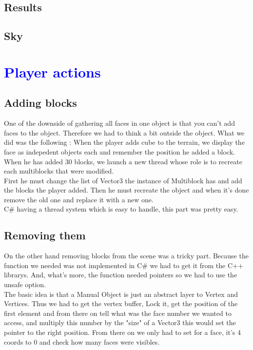 \documentclass[article]{report}             %
\begin{document}
			\section{Results}
			
			\section{Sky}

		\chapter{\textcolor{blue}{Player actions}}
			\section{Adding blocks}
				One of the downside of gathering all faces in one object is that you can't add faces to the object. Therefore we had to think a bit outside the object. What we did was the following : When the player adds cube to the terrain, we display the face as indepedent objects each and remember the position he added a block. When he has added 30 blocks, we launch a new thread whose role is to recreate each multiblocks that were modified.\\

		First he must change the list of Vector3 the instance of Multiblock has and add the blocks the player added. Then he must recreate the object and when it's done remove the old one and replace it with a new one.\\

		C\# having a thread system which is easy to handle, this part was pretty easy.
				
			\section{Removing them}
				On the other hand removing blocks from the scene was a tricky part. Because the function we needed was not implemented in C\# we had to get it from the C++ librarys. And, what's more, the function needed pointers so we had to use the unsafe option.\\
The basic idea is that a Manual Object is just an abstract layer to Vertex and Vertices. Thus we had to get the vertex buffer, Lock it, get the position of the first element and from there on tell what was the face number we wanted to access, and multiply this number by the "size" of a Vector3 this would set the pointer to the right position. From there on we only had to set for a face, it's 4 coords to 0 and check how many faces were visibles.\\
\end{document}
